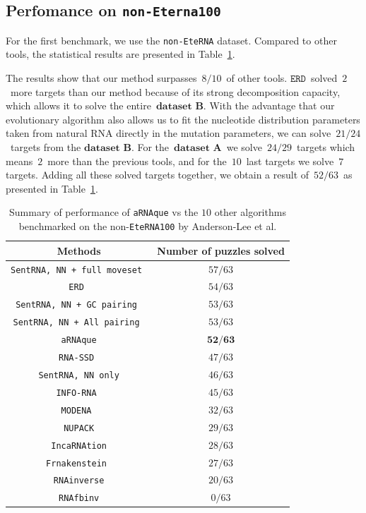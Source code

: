 \subsection{Perfomance on \texttt{non-Eterna100}}
For the first benchmark, we use the \texttt{non-EteRNA} dataset.
Compared to other tools, the statistical results are presented in Table~{\ref{Tab:non-eterna}}.

The results show that our method surpasses~\(8/10\)~of other tools. \(\texttt{ERD}\)~solved~\(2\)~more targets than our method because of its strong decomposition capacity, which allows it to solve the entire~\(\textbf{dataset B}\). With the advantage that our evolutionary algorithm also allows us to fit the nucleotide distribution parameters taken from natural RNA directly in the mutation parameters, we can solve~\(21/24\)~targets from the \(\textbf{dataset B}\). For the~\(\textbf{dataset A}\)~we solve~\(24/29\)~targets which means~\(2\)~more than the previous tools, and for the~\(10\)~last targets we solve~\(7\) targets. Adding all these solved targets together, we obtain a result of~\(52/63\)~as presented in Table~{\ref{Tab:non-eterna}}.
\begin{center}
	\begin{table}[t!]
		\caption{{Summary of performance of \texttt{aRNAque} vs the $10$ other algorithms benchmarked on the non-\texttt{EteRNA100} by Anderson-Lee et al. \cite{anderson2016principles} }} \label{Tab:non-eterna}
		\centering
		\begin{tabular}[t!]{|c|c|}
			\hline
			\textbf{Methods}& Number of puzzles solved\\
			\hline
			\texttt{SentRNA, NN + full moveset }&$57/63$\\
			\hline
			\texttt{ERD }&$54/63$\\
			\hline
			\texttt{SentRNA, NN + GC pairing }&$53/63$\\
			\hline
			\texttt{SentRNA, NN + All pairing }&$53/63$\\
			\hline
			\texttt{aRNAque}&$\textbf{52/63}$\\
			\hline
			\texttt{RNA-SSD }&$47/63$\\
			\hline
			\texttt{SentRNA, NN only}&$46/63$\\
			\hline
			\texttt{INFO-RNA }&$45/63$\\
			\hline
			\texttt{MODENA }&$32/63$\\
			\hline
			\texttt{NUPACK}&$29/63$\\
			\hline
			\texttt{IncaRNAtion}&$28/63$\\
			\hline
			\texttt{Frnakenstein }&$27/63$\\
			\hline
			\texttt{RNAinverse}&$20/63$\\
			\hline
			\texttt{RNAfbinv}&$0/63$\\
			\hline
		\end{tabular}
	\end{table}
\end{center}
